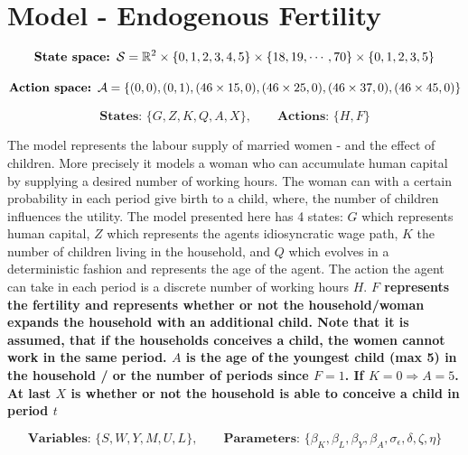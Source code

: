 \section{Model - Endogenous Fertility}

\begin{equation}
    \textbf{State space: }\mathcal{S} = \mathbb{R}^{2} \times \{0, 1, 2, 3, 4, 5\} \times \{ 18, 19, \cdots, 70\} \times \{0, 1, 2, 3, 5 \}
\end{equation}

\begin{equation}
    \textbf{Action space: }\mathcal{A}  = \{(0, 0), (0, 1), (46\times15, 0), (46\times25, 0), (46 \times 37, 0), (46 \times 45, 0)\}
\end{equation}

\begin{equation}
    \textbf{States: }\{G, Z, K, Q, A, X\}, \qquad \textbf{Actions: } \{H, F\} 
\end{equation}

The model represents the labour supply of married women - and the effect of children. More precisely it models a woman who can accumulate human capital by supplying a desired number of working hours. The woman can with a certain probability in each period give birth to a child, where, the number of children influences the utility. The model presented here has 4 states: $G$ which represents human capital, $Z$ which represents the agents idiosyncratic wage path, $K$ the number of children living in the household, and $Q$ which evolves in a deterministic fashion and represents the age of the agent. The action the agent can take in each period is a discrete number of working hours $H$. \textbf{$F$ represents the fertility and represents whether or not the household/woman expands the household with an additional child. Note that it is assumed, that if the households conceives a child, the women cannot work in the same period. $A$ is the age of the youngest child (max 5) in the household / or the number of periods since $F=1$. If $K=0 \Rightarrow A=5$. At last $X$ is whether or not the household is able to conceive a child in period $t$}

\begin{equation}
    \textbf{Variables: }\{S, W, Y, M, U, L\},  \qquad \textbf{Parameters: } \{\beta_K, \beta_L, \beta_Y, \beta_A, \sigma_\epsilon, \delta, \zeta, \eta\}
\end{equation}

